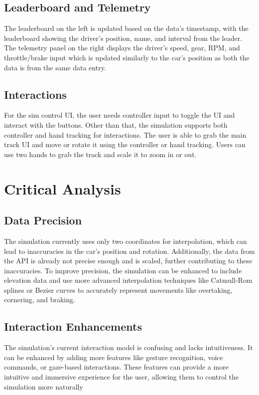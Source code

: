 \documentclass[
	a4paper, %
	10pt, %
	unnumberedsections, %
	twoside, %
]{LTJournalArticle}
\begin{document}
\subsection{Leaderboard and Telemetry}
The leaderboard on the left is updated based on the data's timestamp, with the leaderboard showing the driver's position, name, and interval from the leader. The telemetry panel on the right displays the driver's speed, gear, RPM, and throttle/brake input which is updated similarly to the car's position as both the data is from the same data entry.

\subsection{Interactions}
For the sim control UI, the user needs controller input to toggle the UI and interact with the buttons. Other than that, the simulation supports both controller and hand tracking for interactions. The user is able to grab the main track UI and move or rotate it using the controller or hand tracking. Users can use two hands to grab the track and scale it to zoom in or out.

\section{Critical Analysis}

\subsection{Data Precision}
The simulation currently uses only two coordinates for interpolation, which can lead to inaccuracies in the car's position and rotation. Additionally, the data from the API is already not precise enough and is scaled, further contributing to these inaccuracies. To improve precision, the simulation can be enhanced to include elevation data and use more advanced interpolation techniques like Catmull-Rom splines or Bezier curves to accurately represent movements like overtaking, cornering, and braking.

\subsection{Interaction Enhancements}
The simulation's current interaction model is confusing and lacks intuitiveness. It can be enhanced by adding more features like gesture recognition, voice commands, or gaze-based interactions. These features can provide a more intuitive and immersive experience for the user, allowing them to control the simulation more naturally \autocite{10.1145/3485279.3485288}
\end{document}
